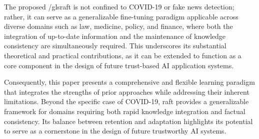 \documentclass[a4paper,fleqn]{cas-sc}
\begin{document}
The proposed /gls{raft} is not confined to COVID-19 or fake news detection; rather, it can serve as a generalizable fine-tuning paradigm applicable across diverse domains such as law, medicine, policy, and finance, where both the integration of up-to-date information and the maintenance of knowledge consistency are simultaneously required.
This underscores its substantial theoretical and practical contributions, as it can be extended to function as a core component in the design of future trust-based AI application systems.

Consequently, this paper presents a comprehensive and flexible learning paradigm that integrates the strengths of prior approaches while addressing their inherent limitations. Beyond the specific case of COVID-19, \gls{raft} provides a generalizable framework for domains requiring both rapid knowledge integration and factual consistency. Its balance between retention and adaptation highlights its potential to serve as a cornerstone in the design of future trustworthy AI systems.
\end{document}
